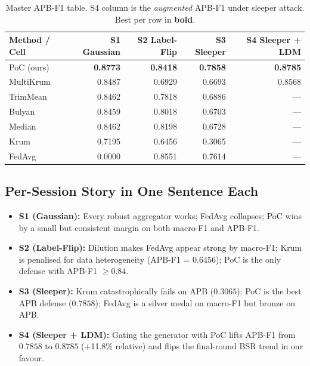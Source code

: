\documentclass[11pt,a4paper]{article}
\begin{document}
\begin{table}[H]
\centering
\caption{Master APB-F1 table. S4 column is the \emph{augmented} APB-F1 under sleeper attack. Best per row in \textbf{bold}.}
\label{tab:master_apb}
\begin{tabular}{@{}l rrr r@{}}
\toprule
\textbf{Method / Cell} & \textbf{S1 Gaussian} & \textbf{S2 Label-Flip} & \textbf{S3 Sleeper} & \textbf{S4 Sleeper + LDM} \\
\midrule
PoC (ours)                        & \textbf{0.8773} & \textbf{0.8418} & \textbf{0.7858} & \textbf{0.8785} \\
MultiKrum                         & 0.8487 & 0.6929 & 0.6693 & 0.8568 \\
TrimMean                          & 0.8462 & 0.7818 & 0.6886 & --- \\
Bulyan                            & 0.8459 & 0.8018 & 0.6703 & --- \\
Median                            & 0.8462 & 0.8198 & 0.6728 & --- \\
Krum                              & 0.7195 & 0.6456 & \cellcolor{softred}0.3065 & --- \\
FedAvg                            & \cellcolor{softred}0.0000 & 0.8551 & 0.7614 & --- \\
\bottomrule
\end{tabular}
\end{table}

\subsection{Per-Session Story in One Sentence Each}

\begin{itemize}[nosep]
    \item \textbf{S1 (Gaussian):} Every robust aggregator works; FedAvg
          collapses; PoC wins by a small but consistent margin on both
          macro-F1 and APB-F1.
    \item \textbf{S2 (Label-Flip):} Dilution makes FedAvg appear strong by
          macro-F1; Krum is penalised for data heterogeneity (APB-F1 =
          $0.6456$); PoC is the only defense with APB-F1 $\geq 0.84$.
    \item \textbf{S3 (Sleeper):} Krum catastrophically fails on APB
          ($0.3065$); PoC is the best APB defense ($0.7858$); FedAvg
          is a silver medal on macro-F1 but bronze on APB.
    \item \textbf{S4 (Sleeper + LDM):} Gating the generator with PoC
          lifts APB-F1 from $0.7858$ to $0.8785$ (+11.8\% relative) and
          flips the final-round BSR trend in our favour.
\end{itemize}
\end{document}
